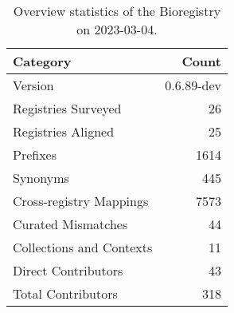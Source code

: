 \begin{table}
\centering
\caption{Overview statistics of the Bioregistry on 2023-03-04.}
\label{tab:bioregistry-summary}
\begin{tabular}{lr}
\toprule
                Category &      Count \\
\midrule
                 Version & 0.6.89-dev \\
     Registries Surveyed &         26 \\
      Registries Aligned &         25 \\
                Prefixes &       1614 \\
                Synonyms &        445 \\
 Cross-registry Mappings &       7573 \\
      Curated Mismatches &         44 \\
Collections and Contexts &         11 \\
     Direct Contributors &         43 \\
      Total Contributors &        318 \\
\bottomrule
\end{tabular}
\end{table}
